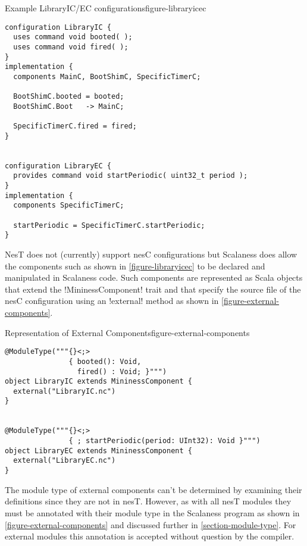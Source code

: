 \singlespace
\begin{fpfig}[tbhp]{Example LibraryIC/EC configurations}{figure-libraryicec}
{
\begin{lstlisting}[language=nesC]
configuration LibraryIC {
  uses command void booted( );
  uses command void fired( );
}
implementation {
  components MainC, BootShimC, SpecificTimerC;

  BootShimC.booted = booted;
  BootShimC.Boot   -> MainC;

  SpecificTimerC.fired = fired;
}


configuration LibraryEC {
  provides command void startPeriodic( uint32_t period );
}
implementation {
  components SpecificTimerC;

  startPeriodic = SpecificTimerC.startPeriodic;
}
\end{lstlisting}
}
\end{fpfig}
\primaryspacing

NesT does not (currently) support nesC configurations but Scalaness does allow the components
such as shown in \autoref{figure-libraryicec} to be declared and manipulated in Scalaness code.
Such components are represented as Scala objects that extend the !MininessComponent! trait and
that specify the source file of the nesC configuration using an !external! method as shown in
\autoref{figure-external-components}.

\singlespace
\begin{fpfig}[tbhp]{Representation of External Components}{figure-external-components}
{
\begin{lstlisting}[language=scalaness]
@ModuleType("""{}<;>
               { booted(): Void,
                 fired() : Void; }""")
object LibraryIC extends MininessComponent {
  external("LibraryIC.nc")
}


@ModuleType("""{}<;>
               { ; startPeriodic(period: UInt32): Void }""")
object LibraryEC extends MininessComponent {
  external("LibraryEC.nc")
}
\end{lstlisting}
}
\end{fpfig}
\primaryspacing

The module type of external components can't be determined by examining their definitions since
they are not in nesT. However, as with all nesT modules they must be annotated with their module
type in the Scalaness program as shown in \autoref{figure-external-components} and discussed
further in \autoref{section-module-type}. For external modules this annotation is accepted
without question by the compiler.

